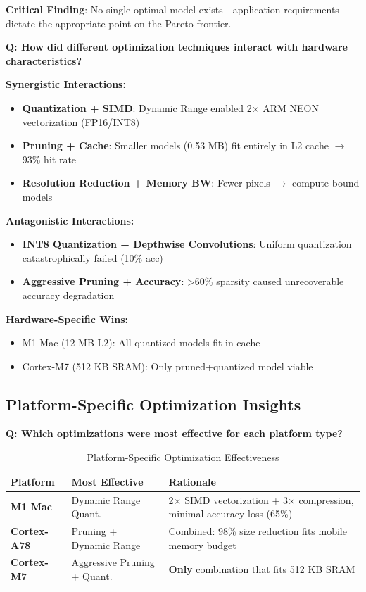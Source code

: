 \documentclass[10pt, a4paper]{article}
\begin{document}
\textbf{Critical Finding}: No single optimal model exists - application requirements dictate the appropriate point on the Pareto frontier.

\textbf{Q: How did different optimization techniques interact with hardware characteristics?}

\textbf{Synergistic Interactions:}
\begin{itemize}
    \item \textbf{Quantization + SIMD}: Dynamic Range enabled 2× ARM NEON vectorization (FP16/INT8)
    \item \textbf{Pruning + Cache}: Smaller models (0.53 MB) fit entirely in L2 cache $\rightarrow$ 93\% hit rate
    \item \textbf{Resolution Reduction + Memory BW}: Fewer pixels $\rightarrow$ compute-bound models
\end{itemize}

\textbf{Antagonistic Interactions:}
\begin{itemize}
    \item \textbf{INT8 Quantization + Depthwise Convolutions}: Uniform quantization catastrophically failed (10\% acc)
    \item \textbf{Aggressive Pruning + Accuracy}: >60\% sparsity caused unrecoverable accuracy degradation
\end{itemize}

\textbf{Hardware-Specific Wins:}
\begin{itemize}
    \item M1 Mac (12 MB L2): All quantized models fit in cache
    \item Cortex-M7 (512 KB SRAM): Only pruned+quantized model viable
\end{itemize}

\subsection{Platform-Specific Optimization Insights}

\textbf{Q: Which optimizations were most effective for each platform type?}

\begin{table}[H]
\centering
\footnotesize
\begin{tabular}{|l|p{4cm}|p{6cm}|}
\hline
\textbf{Platform} & \textbf{Most Effective} & \textbf{Rationale} \\
\hline
\textbf{M1 Mac} & Dynamic Range Quant. & 2× SIMD vectorization + 3× compression, minimal accuracy loss (65\%) \\
\textbf{Cortex-A78} & Pruning + Dynamic Range & Combined: 98\% size reduction fits mobile memory budget \\
\textbf{Cortex-M7} & Aggressive Pruning + Quant. & \textbf{Only} combination that fits 512 KB SRAM \\
\hline
\end{tabular}
\caption{Platform-Specific Optimization Effectiveness}
\end{table}
\end{document}
